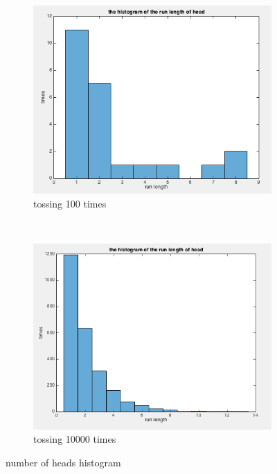 \documentclass[twoside]{article}
\begin{document}
\begin{figure}%
   \begin{center}
   \begin{subfigure}{0.55\textwidth}
   \includegraphics[scale = 0.45]{../data/exp3.png}
   \caption{tossing 100 times}
   \end{subfigure}
   ~
   \begin{subfigure}{0.55\textwidth}
   \includegraphics[scale = 0.45]{../data/exp3_e.png}
   \caption{tossing 10000 times}
   \end{subfigure}
   \end{center} 
   \caption{number of heads histogram}  
   \vspace{-20pt}
\end{figure} 
\end{document}
